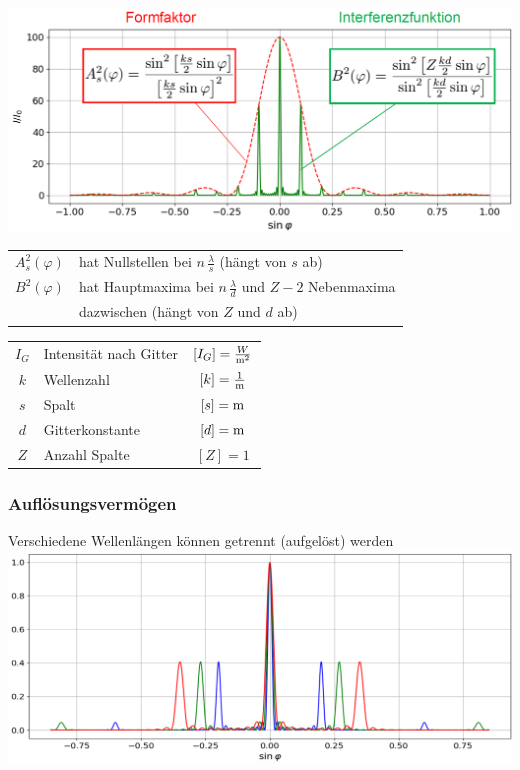 \includegraphics[width=0.9\linewidth]{Bilder/Wellen-Optik/beugung_gitter_intensitaet} \\
\vspace{0.2cm} 
\renewcommand{\arraystretch}{1.2}
\begin{tabular}{ll}
$A_s^2(\varphi)$ & hat Nullstellen bei $n \, \frac{\lambda}{s}$ (hängt von $s$ ab) \\
$B^2(\varphi)$ & hat Hauptmaxima bei $n \, \frac{\lambda}{d}$ und $Z - 2$ Nebenmaxima\\
& dazwischen (hängt von $Z$ und $d$ ab)\\
\end{tabular}
\renewcommand{\arraystretch}{1}


\vspace{0.2cm}

\renewcommand{\arraystretch}{1.3}
\begin{tabular}{clc}
$I_G$ & Intensität nach Gitter & $[I_G] = \frac{W}{\mathrm{m}^2}$ \\
$k$ & Wellenzahl & $[k] = \frac{1}{\mathrm{m}}$ \\
$s$ & Spalt & $[s] = \mathrm{m}$ \\
$d$ & Gitterkonstante & $[d] = \mathrm{m}$ \\
$Z$ & Anzahl Spalte & $[Z] = 1$
\end{tabular}
\renewcommand{\arraystretch}{1}



\subsubsection{Auflösungsvermögen}

Verschiedene Wellenlängen können getrennt (aufgelöst) werden \\


\includegraphics[width=0.9\linewidth]{Bilder/Wellen-Optik/aufloesungsvermoegen} \\

